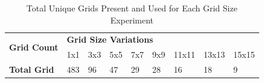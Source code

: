 \documentclass[runningheads]{llncs}
\begin{document}

\vspace{-10pt}
\begin{table}[htbp]
	\caption{Total Unique Grids Present and Used for Each Grid Size Experiment}
	\label{tab:grid_size_variations}
	\centering
	\begin{tabular}{|l|l|l|l|l|l|l|l|l|} 
		\hline
		\multirow{2}{*}{\textbf{Grid Count }} & \multicolumn{8}{l|}{\textbf{Grid Size Variations}}   \\ 
		\cline{2-9}
		& 1x1 & 3x3 & 5x5 & 7x7 & 9x9 & 11x11 & 13x13 & 15x15  \\ 
		\hline
		\textbf{Total Grid}                   & 483 & 96  & 47  & 29  & 28  & 16    & 18    & 9      \\
		\hline
	\end{tabular}
\end{table}

\end{document}
